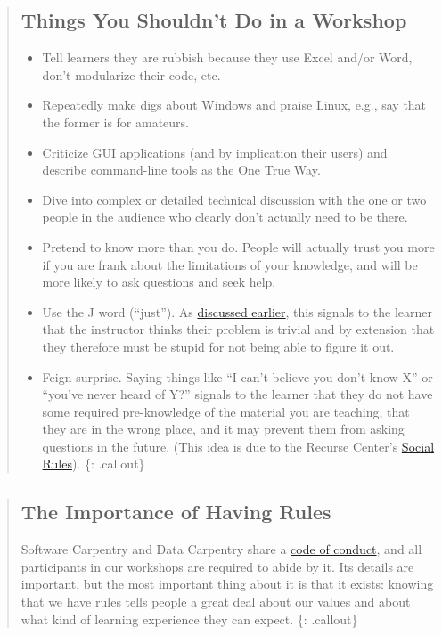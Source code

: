 \begin{quote}
\subsection{Things You Shouldn't Do in a
Workshop}\label{things-you-shouldnt-do-in-a-workshop}

\begin{itemize}
\itemsep1pt\parskip0pt
\item
  Tell learners they are rubbish because they use Excel and/or Word,
  don't modularize their code, etc.
\item
  Repeatedly make digs about Windows and praise Linux, e.g., say that
  the former is for amateurs.
\item
  Criticize GUI applications (and by implication their users) and
  describe command-line tools as the One True Way.
\item
  Dive into complex or detailed technical discussion with the one or two
  people in the audience who clearly don't actually need to be there.
\item
  Pretend to know more than you do. People will actually trust you more
  if you are frank about the limitations of your knowledge, and will be
  more likely to ask questions and seek help.
\item
  Use the J word (``just''). As
  \href{\{\{\%20page.root\%20\}\}/08-memory/}{discussed earlier}, this
  signals to the learner that the instructor thinks their problem is
  trivial and by extension that they therefore must be stupid for not
  being able to figure it out.
\item
  Feign surprise. Saying things like ``I can't believe you don't know
  X'' or ``you've never heard of Y?'' signals to the learner that they
  do not have some required pre-knowledge of the material you are
  teaching, that they are in the wrong place, and it may prevent them
  from asking questions in the future. (This idea is due to the Recurse
  Center's \href{https://www.recurse.com/manual\#sec-environment}{Social
  Rules}). \{: .callout\}
\end{itemize}
\end{quote}

\begin{quote}
\subsection{The Importance of Having
Rules}\label{the-importance-of-having-rules}

Software Carpentry and Data Carpentry share a
\href{\{\{\%20site.swc_site\%20\}\}/conduct/}{code of conduct}, and all
participants in our workshops are required to abide by it. Its details
are important, but the most important thing about it is that it exists:
knowing that we have rules tells people a great deal about our values
and about what kind of learning experience they can expect. \{:
.callout\}
\end{quote}

